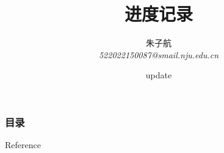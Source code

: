 \documentclass{njupre/njupre}
\title[进度记录]{ 进度记录 }
\author[朱子航]{\texorpdfstring{朱子航 \\ \smallskip \textit{522022150087@smail.nju.edu.cn}}{}}
\date[\today]{\texorpdfstring{update}{}}
\begin{document}
\begin{frame}
    \titlepage
\end{frame}
\begin{frame}
    \frametitle{目录}
    \tableofcontents
\end{frame}

\begin{frame}[allowframebreaks]{Reference}
    
    
\end{frame}
\end{document}
